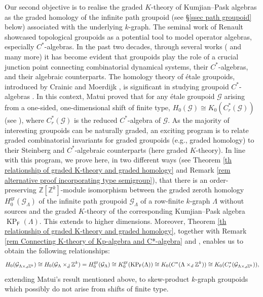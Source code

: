 \documentclass[12pt]{amsart}
\newcommand{\ZZ}{\mathbb{Z}}
\newcommand{\KP}{\operatorname{KP}}
\theoremstyle{definition}
\theoremstyle{remark}
\newcommand{\gr}{\operatorname{gr}}
\begin{document}
Our second objective is to realise the graded $K$-theory of Kumjian--Pask algebras as the graded homology \cite{H-Li} of the infinite path groupoid (see \S \ref{ssec path groupoid} below) associated with the underlying $k$-graph. The seminal work of Renault \cite{Renault} showcased topological groupoids as a potential tool to model operator algebras, especially $C^*$-algebras. In the past two decades, through several works (\cite{Bosa, ABBL, Ara-Hazrat, CHR, Clark, H-Li, Kumjian--Pask, Matui, MatAdv} and many more) it has become evident that groupoids play the role of a crucial junction point connecting combinatorial dynamical systems, their $C^*$-algebras, and their algebraic counterparts. The homology theory of \'{e}tale groupoids, introduced by Crainic and Moerdijk \cite{Crainic}, is significant in studying groupoid $C^*$-algebras \cite{Matui, MatAdv}. In this context, Matui proved that for any \'{e}tale groupoid $\mathcal{G}$ arising from a one-sided, one-dimensional shift of finite type, $H_0(\mathcal{G})\cong K_0(C_r^*(\mathcal{G}))$ (see \cite[Theorem 4.14]{Matui}), where $C_r^*(\mathcal{G})$ is the reduced $C^*$-algebra of $\mathcal{G}$. As the majority of interesting groupoids can be naturally graded, an exciting program is to relate graded combinatorial invariants for graded groupoids (e.g., graded homology) to their Steinberg and $C^*$-algebraic counterparts (here graded $K$-theory). In line with this program, we prove here, in two different ways (see Theorem \ref{th relationship of graded K-theory and graded homology} and Remark \ref{rem alternative proof incorporating type semigroup}), that there is an order-preserving $\ZZ[\ZZ^k]$-module isomorphism between the graded zeroth homology $H_0^{\gr}(\mathcal{G}_\Lambda)$ of the infinite path groupoid $\mathcal{G}_\Lambda$ of a row-finite $k$-graph $\Lambda$ without sources and the graded $K$-theory of the corresponding Kumjian--Pask algebra $\KP_\mathsf{F}(\Lambda)$. This extends \cite[Theorem 6.6]{H-Li} to higher dimensions. Moreover, Theorem \ref{th relationship of graded K-theory and graded homology}, together with Remark \ref{rem Connecting K-theory of Kp-algebra and C*-algebra} and \cite[Corollary 3.5 $(i)$]{Kumjian--Pask}, enables us to obtain the following relationships: \[H_0(\mathcal{G}_{\Lambda\times_d \ZZ^k})\cong H_0(\mathcal{G}_\Lambda\times_{\Tilde{d}}\ZZ^k)=H_0^{\gr}(\mathcal{G}_\Lambda)\cong K_0^{\gr}(\KP_\mathsf{F}(\Lambda))\cong K_0(C^*(\Lambda\times_d \ZZ^k))\cong K_0(C_r^*(\mathcal{G}_{\Lambda\times_d \ZZ^k})),\] extending Matui's result mentioned above, to skew-product $k$-graph groupoids which possibly do not arise from shifts of finite type.
\end{document}

